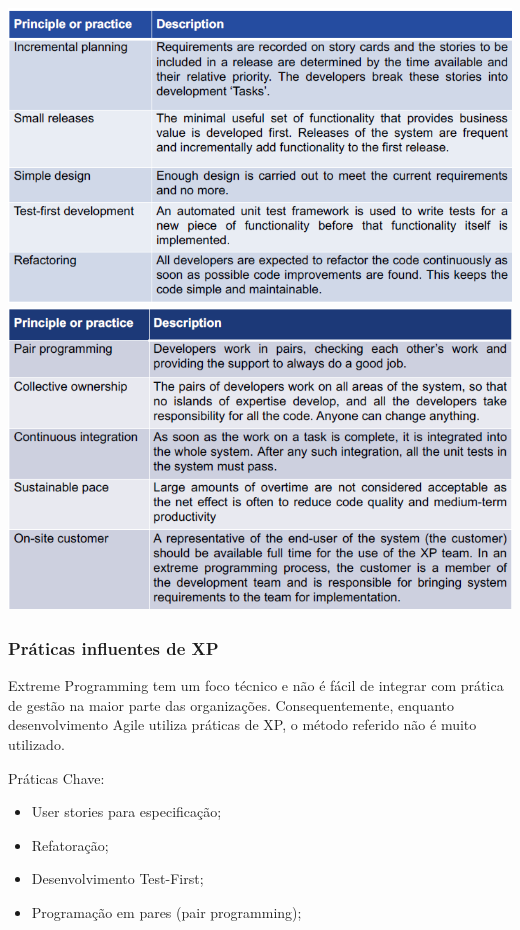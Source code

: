 \documentclass{article}
\begin{document}
\begin{center}
  \includegraphics[scale=0.45]{23}
  \includegraphics[scale=0.45]{24}
\end{center}

\subsubsection{Práticas influentes de XP}

Extreme Programming tem um foco técnico e não é fácil de integrar
com prática de gestão na maior parte das organizações.
Consequentemente, enquanto desenvolvimento Agile utiliza práticas
de XP, o método referido não é muito utilizado.

\vspace{2mm}

Práticas Chave:
\begin{itemize}
  \item User stories para especificação;
  \item Refatoração;
  \item Desenvolvimento Test-First;
  \item Programação em pares (pair programming);
\end{itemize}
\end{document}
